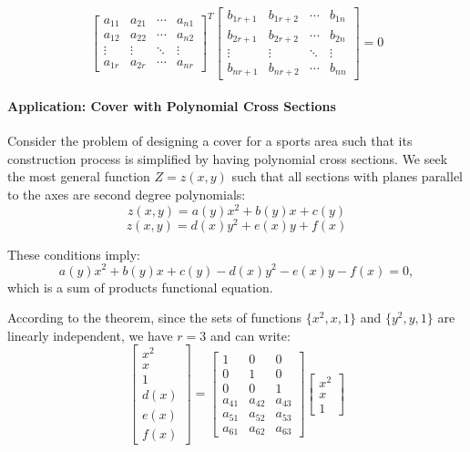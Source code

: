 \begin{theorem}
$$\begin{bmatrix} a_{11} & a_{21} & \cdots & a_{n1} \\ a_{12} & a_{22} & \cdots & a_{n2} \\ \vdots & \vdots & \ddots & \vdots \\ a_{1r} & a_{2r} & \cdots & a_{nr} \end{bmatrix}^T \begin{bmatrix} b_{1r+1} & b_{1r+2} & \cdots & b_{1n} \\ b_{2r+1} & b_{2r+2} & \cdots & b_{2n} \\ \vdots & \vdots & \ddots & \vdots \\ b_{nr+1} & b_{nr+2} & \cdots & b_{nn} \end{bmatrix} = 0$$
\end{theorem}

\paragraph{Application: Cover with Polynomial Cross Sections}
Consider the problem of designing a cover for a sports area such that its construction process is simplified by having polynomial cross sections. We seek the most general function $Z = z(x,y)$ such that all sections with planes parallel to the axes are second degree polynomials:
$$z(x,y) = a(y)x^2 + b(y)x + c(y)$$
$$z(x,y) = d(x)y^2 + e(x)y + f(x)$$

These conditions imply:
$$a(y)x^2 + b(y)x + c(y) - d(x)y^2 - e(x)y - f(x) = 0,$$
which is a sum of products functional equation.

According to the theorem, since the sets of functions $\{x^2, x, 1\}$ and $\{y^2, y, 1\}$ are linearly independent, we have $r = 3$ and can write:
$$\begin{bmatrix} x^2 \\ x \\ 1 \\ d(x) \\ e(x) \\ f(x) \end{bmatrix} = \begin{bmatrix} 1 & 0 & 0 \\ 0 & 1 & 0 \\ 0 & 0 & 1 \\ a_{41} & a_{42} & a_{43} \\ a_{51} & a_{52} & a_{53} \\ a_{61} & a_{62} & a_{63} \end{bmatrix} \begin{bmatrix} x^2 \\ x \\ 1 \end{bmatrix}$$


